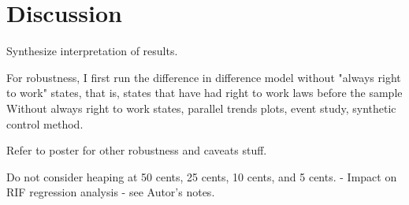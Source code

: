\documentclass[11pt]{article}
\begin{document}

\section{Discussion}
Synthesize interpretation of results.

For robustness, I first run the difference in difference model without "always right to work" states, that is, states that have had right to work laws before the sample
Without always right to work states, parallel trends plots, event study, synthetic control method.

Refer to poster for other robustness and caveats stuff.

Do not consider heaping at 50 cents, 25 cents, 10 cents, and 5 cents. - Impact on RIF regression analysis - see Autor's notes.
\end{document}
